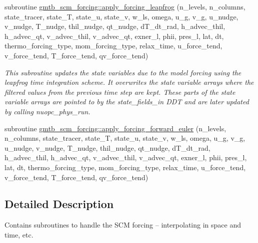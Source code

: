 \begin{DoxyCompactItemize}
\item 
subroutine \hyperlink{group__forcing_gaa9a429a52d986be1bc2458f56e8f77aa}{gmtb\+\_\+scm\+\_\+forcing\+::apply\+\_\+forcing\+\_\+leapfrog} (n\+\_\+levels, n\+\_\+columns, state\+\_\+tracer, state\+\_\+T, state\+\_\+u, state\+\_\+v, w\+\_\+ls, omega, u\+\_\+g, v\+\_\+g, u\+\_\+nudge,   v\+\_\+nudge, T\+\_\+nudge, thil\+\_\+nudge, qt\+\_\+nudge, d\+T\+\_\+dt\+\_\+rad, h\+\_\+advec\+\_\+thil, h\+\_\+advec\+\_\+qt, v\+\_\+advec\+\_\+thil, v\+\_\+advec\+\_\+qt, exner\+\_\+l, phii, pres\+\_\+l,   lat, dt, thermo\+\_\+forcing\+\_\+type, mom\+\_\+forcing\+\_\+type, relax\+\_\+time, u\+\_\+force\+\_\+tend, v\+\_\+force\+\_\+tend, T\+\_\+force\+\_\+tend, qv\+\_\+force\+\_\+tend)
\begin{DoxyCompactList}\small\item\em This subroutine updates the state variables due to the model forcing using the leapfrog time integration scheme. It overwrites the state variable arrays where the filtered values from the previous time step are kept. These parts of the state variable arrays are pointed to by the state\+\_\+fields\+\_\+in D\+DT and are later updated by calling nuopc\+\_\+phys\+\_\+run. \end{DoxyCompactList}\end{DoxyCompactItemize}
\begin{DoxyCompactItemize}
\item 
subroutine \hyperlink{group__forcing_ga9f9e7db891365f55c3ce79e70a8fe580}{gmtb\+\_\+scm\+\_\+forcing\+::apply\+\_\+forcing\+\_\+forward\+\_\+euler} (n\+\_\+levels, n\+\_\+columns, state\+\_\+tracer, state\+\_\+T, state\+\_\+u, state\+\_\+v, w\+\_\+ls, omega, u\+\_\+g, v\+\_\+g,   u\+\_\+nudge, v\+\_\+nudge, T\+\_\+nudge, thil\+\_\+nudge, qt\+\_\+nudge, d\+T\+\_\+dt\+\_\+rad, h\+\_\+advec\+\_\+thil, h\+\_\+advec\+\_\+qt, v\+\_\+advec\+\_\+thil, v\+\_\+advec\+\_\+qt, exner\+\_\+l, phii,   pres\+\_\+l, lat, dt, thermo\+\_\+forcing\+\_\+type, mom\+\_\+forcing\+\_\+type, relax\+\_\+time, u\+\_\+force\+\_\+tend, v\+\_\+force\+\_\+tend, T\+\_\+force\+\_\+tend, qv\+\_\+force\+\_\+tend)
\end{DoxyCompactItemize}


\subsection{Detailed Description}
Contains subroutines to handle the S\+CM forcing -- interpolating in space and time, etc. 



